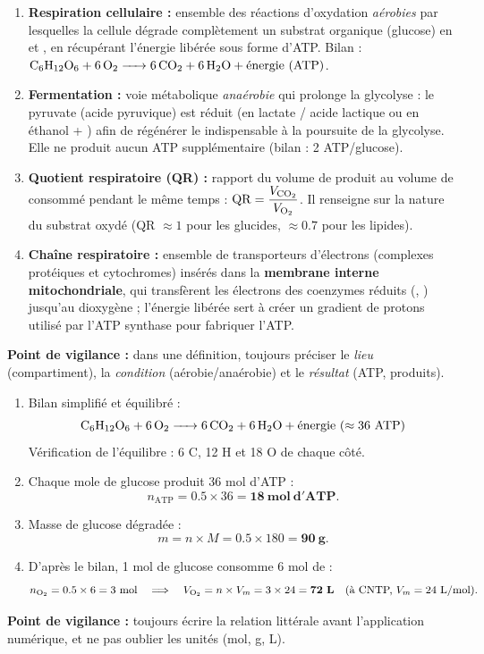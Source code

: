 \documentclass[11pt]{article}
\begin{document}
\begin{corrige}
\begin{enumerate}
\item \textbf{Respiration cellulaire :} ensemble des réactions d'oxydation \emph{aérobies} par lesquelles la cellule dégrade complètement un substrat organique (glucose) en  et , en récupérant l'énergie libérée sous forme d'ATP. Bilan : $\ce{C6H12O6 + 6 O2 -> 6 CO2 + 6 H2O} + \text{énergie (ATP)}$.
\item \textbf{Fermentation :} voie métabolique \emph{anaérobie} qui prolonge la glycolyse : le pyruvate (acide pyruvique) est réduit (en lactate / acide lactique ou en éthanol + ) afin de régénérer le  indispensable à la poursuite de la glycolyse. Elle ne produit aucun ATP supplémentaire (bilan : 2 ATP/glucose).
\item \textbf{Quotient respiratoire (QR) :} rapport du volume de  produit au volume de  consommé pendant le même temps : $\mathrm{QR} = \dfrac{V_{\ce{CO2}}}{V_{\ce{O2}}}$. Il renseigne sur la nature du substrat oxydé (QR $\approx 1$ pour les glucides, $\approx \num{0,7}$ pour les lipides).
\item \textbf{Chaîne respiratoire :} ensemble de transporteurs d'électrons (complexes protéiques et cytochromes) insérés dans la \textbf{membrane interne mitochondriale}, qui transfèrent les électrons des coenzymes réduits (, ) jusqu'au dioxygène ; l'énergie libérée sert à créer un gradient de protons utilisé par l'ATP synthase pour fabriquer l'ATP.
\end{enumerate}
\textbf{Point de vigilance :} dans une définition, toujours préciser le \emph{lieu} (compartiment), la \emph{condition} (aérobie/anaérobie) et le \emph{résultat} (ATP, produits).
\end{corrige}

\begin{corrige}
\begin{enumerate}
\item Bilan simplifié et équilibré :
\[ \ce{C6H12O6 + 6 O2 -> 6 CO2 + 6 H2O} + \text{énergie } (\approx 36\ \text{ATP}) \]
Vérification de l'équilibre : 6 C, 12 H et 18 O de chaque côté.
\item Chaque mole de glucose produit 36 mol d'ATP :
\[ n_{\mathrm{ATP}} = \num{0,5} \times 36 = \mathbf{18\ mol\ d'ATP}. \]
\item Masse de glucose dégradée :
\[ m = n \times M = \num{0,5} \times 180 = \mathbf{90\ g}. \]
\item D'après le bilan, 1 mol de glucose consomme 6 mol de  :
\[ n_{\ce{O2}} = \num{0,5} \times 6 = 3\ \text{mol} \quad\Longrightarrow\quad V_{\ce{O2}} = n \times V_m = 3 \times 24 = \mathbf{72\ L} \quad (\text{à CNTP, } V_m = \num{24}\ \text{L/mol}). \]
\end{enumerate}
\textbf{Point de vigilance :} toujours écrire la relation littérale avant l'application numérique, et ne pas oublier les unités (mol, g, L).
\end{corrige}
\end{document}
